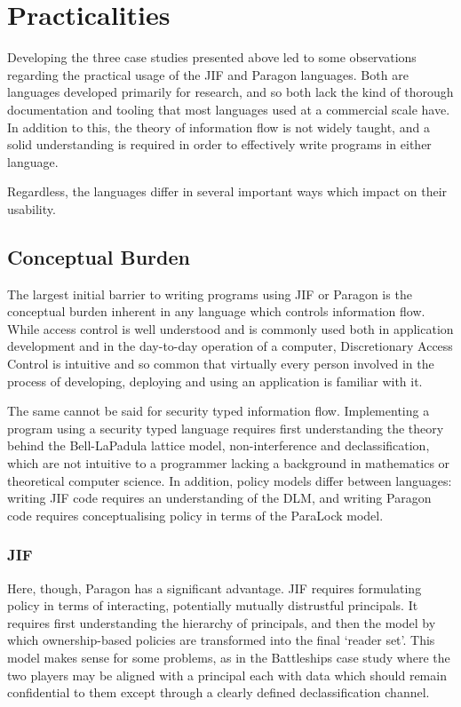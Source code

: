 \section{Practicalities} \label{sect_practicalities}

Developing the three case studies presented above led to some observations regarding the practical usage of the JIF and Paragon languages. Both are languages developed primarily for research, and so both lack the kind of thorough documentation and tooling that most languages used at a commercial scale have. In addition to this, the theory of information flow is not widely taught, and a solid understanding is required in order to effectively write programs in either language.

Regardless, the languages differ in several important ways which impact on their usability.

\subsection{Conceptual Burden}

The largest initial barrier to writing programs using JIF or Paragon is the conceptual burden inherent in any language which controls information flow. While access control is well understood and is commonly used both in application development and in the day-to-day operation of a computer, Discretionary Access Control is intuitive and so common that virtually every person involved in the process of developing, deploying and using an application is familiar with it.

The same cannot be said for security typed information flow. Implementing a program using a security typed language requires first understanding the theory behind the Bell-LaPadula lattice model, non-interference and declassification, which are not intuitive to a programmer lacking a background in mathematics or theoretical computer science. In addition, policy models differ between languages: writing JIF code requires an understanding of the DLM, and writing Paragon code requires conceptualising policy in terms of the ParaLock model.

\subsubsection{JIF}

Here, though, Paragon has a significant advantage. JIF requires formulating policy in terms of interacting, potentially mutually distrustful principals. It requires first understanding the hierarchy of principals, and then the model by which ownership-based policies are transformed into the final `reader set'. This model makes sense for some problems, as in the Battleships case study where the two players may be aligned with a principal each with data which should remain confidential to them except through a clearly defined declassification channel.

